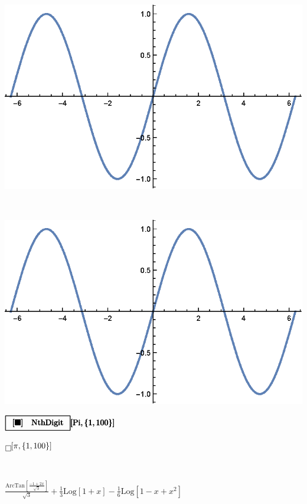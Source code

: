 \documentclass{article}
\begin{document}
\(\)

\includegraphics{WLG_gr7.eps}

\(\)

\includegraphics{WLG_gr8.eps}

\begin{doublespace}
\noindent\(\pmb{\fbox{$
\begin{array}{cc}
 \text{[$\blacksquare$]} & \text{NthDigit}  \\
\end{array}
$}[\text{Pi}, \{1, 100\}]}\)
\end{doublespace}

\begin{doublespace}
\noindent\(\fbox{$$}[\pi ,\{1,100\}]\)
\end{doublespace}

\(\)

\begin{doublespace}
\noindent\(\frac{\text{ArcTan}\left[\frac{-1+2 x}{\sqrt{3}}\right]}{\sqrt{3}}+\frac{1}{3} \text{Log}[1+x]-\frac{1}{6} \text{Log}\left[1-x+x^2\right]\)
\end{doublespace}
\end{document}
